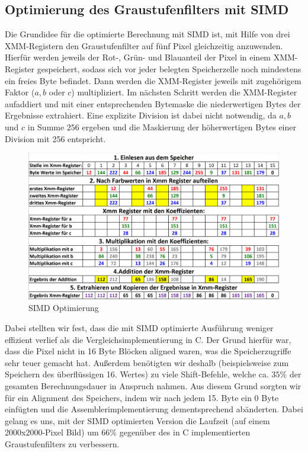 \documentclass[course=erap]{aspdoc}
\begin{document}
	\subsection{Optimierung des Graustufenfilters mit SIMD}
	Die Grundidee für die optimierte Berechnung mit SIMD ist, mit Hilfe von drei XMM-Registern den Graustufenfilter auf fünf Pixel gleichzeitig anzuwenden. Hierfür werden jeweils der Rot-, Grün- und Blauanteil der Pixel in einem XMM-Register gespeichert, sodass sich vor jeder belegten Speicherzelle noch mindestens ein freies Byte befindet. Dann werden die XMM-Register jeweils mit zugehörigem Faktor ($a,b$ oder $c$) multipliziert. Im nächsten Schritt werden die XMM-Register aufaddiert und mit einer entsprechenden Bytemaske die niederwertigen Bytes der Ergebnisse extrahiert. Eine explizite Division ist dabei nicht notwendig, da $a,b$ und $c$ in Summe $256$ ergeben und die Maskierung der höherwertigen Bytes einer Division mit 256 entspricht.
    \begin{figure}[H]
			\centering
			\includegraphics[scale=0.46]{Images/SIMDoptimization.png}
			\caption{SIMD Optimierung}
			\label{SimdOptimization}
	\end{figure}
	\noindent
	Dabei stellten wir fest, dass die mit SIMD optimierte Ausführung weniger effizient verlief als die Vergleichsimplementierung in C. Der Grund hierfür war, dass die Pixel nicht in 16 Byte Blöcken aligned waren, was die Speicherzugriffe sehr teuer gemacht hat.
	Außerdem benötigten wir deshalb (beispielsweise zum Speichern des überflüssigen 16. Wertes) zu viele Shift-Befehle, welche ca. $35\%$ der gesamten Berechnungsdauer in Anspruch nahmen. Aus diesem Grund sorgten wir für ein Alignment des Speichers, indem wir nach jedem 15. Byte ein 0 Byte einfügten und die Assemblerimplementierung dementsprechend abänderten. Dabei gelang es uns, mit der SIMD optimierten Version die Laufzeit (auf einem 2000x2000-Pixel Bild) um $66\%$ gegenüber des in C implementierten Graustufenfilters zu verbessern.  
	
\end{document}
